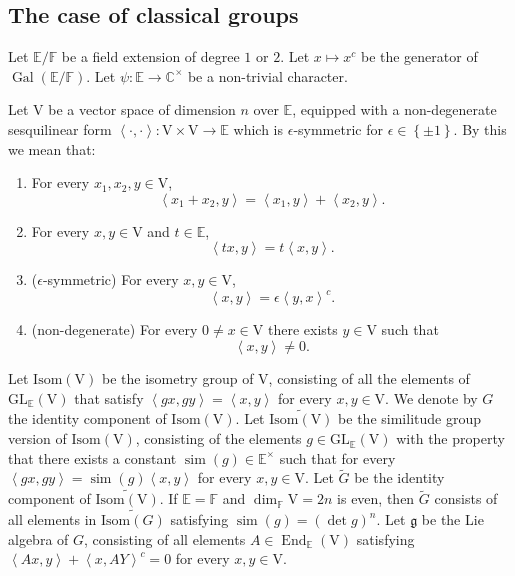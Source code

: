 \documentclass[12pt, reqno]{amsart}
\theoremstyle{definition}
\theoremstyle{definition}
\theoremstyle{definition}
\newcommand{\cComplex}{\mathbb{C}}
\newcommand{\multiplicativegroup}[1]{#1^{\times}}
\newcommand{\EndomorphismRing}{\operatorname{End}}
\newcommand{\hermitianSpace}{\mathrm{V}}
\newcommand{\similitudeCharacter}{\operatorname{sim}}
\newcommand{\innerproduct}[2]{\left\langle #1,#2\right\rangle}
\newcommand{\fieldCharacter}{\psi}
\newcommand{\involution}[1]{#1^{c}}
\newcommand{\GL}{\mathrm{GL}}
\newcommand{\GroupExtension}[1]{\widetilde{#1}}
\newcommand{\finiteField}{\mathbb{F}}
\newcommand{\quadraticExtension}{\mathbb{E}}
\newcommand{\Galois}{\operatorname{Gal}}
\newcommand{\IsometryGroup}{\mathrm{Isom}}
\newcommand{\lieAlgebra}{\mathfrak{g}}
\begin{document}
\subsection{The case of classical groups}

Let $\quadraticExtension \slash \finiteField$ be a field extension of degree $1$ or $2$. Let $x \mapsto \involution{x}$ be the generator of $\Galois\left(\quadraticExtension \slash \finiteField\right)$. Let $\fieldCharacter \colon \quadraticExtension \to \multiplicativegroup{\cComplex}$ be a non-trivial character.

Let $\hermitianSpace$ be a vector space of dimension $n$ over $\quadraticExtension$, equipped with a non-degenerate sesquilinear form $\innerproduct{\cdot}{\cdot} \colon \hermitianSpace \times \hermitianSpace \to \quadraticExtension$ which is $\epsilon$-symmetric for $\epsilon \in \left\{\pm 1\right\}$. By this we mean that:
\begin{enumerate}
	\item For every $x_1,x_2,y \in \hermitianSpace$, $$\innerproduct{x_1 + x_2}{y} = \innerproduct{x_1}{y} + \innerproduct{x_2}{y}.$$
	\item For every $x,y \in \hermitianSpace$ and $t \in \quadraticExtension$, $$\innerproduct{tx}{y} = t\innerproduct{x}{y}.$$
	\item ($\epsilon$-symmetric) For every $x,y \in \hermitianSpace$, $$\innerproduct{x}{y} = \epsilon \involution{\innerproduct{y}{x}}.$$
	\item (non-degenerate) For every $0 \ne x \in \hermitianSpace$ there exists $y \in \hermitianSpace$ such that $$\innerproduct{x}{y} \ne 0.$$
\end{enumerate}
Let $\IsometryGroup \left(\hermitianSpace\right)$ be the isometry group of $\hermitianSpace$, consisting of all the elements of $\GL_{\quadraticExtension}\left(\hermitianSpace\right)$ that satisfy $\innerproduct{gx}{gy} = \innerproduct{x}{y}$ for every $x,y \in \hermitianSpace$. We denote by $G$ the identity component of $\IsometryGroup\left(\hermitianSpace\right)$. Let $\GroupExtension{\IsometryGroup\left(\hermitianSpace\right)}$ be the similitude group version of $\IsometryGroup\left(\hermitianSpace\right)$, consisting of the elements $g \in \GL_{\quadraticExtension}\left(\hermitianSpace\right)$ with the property that there exists a constant $\similitudeCharacter\left(g\right) \in \multiplicativegroup{\quadraticExtension}$ such that for every $\innerproduct{gx}{gy} = \similitudeCharacter\left(g\right) \innerproduct{x}{y}$ for every $x,y \in \hermitianSpace$. Let $\GroupExtension{G}$ be the identity component of $\GroupExtension{\IsometryGroup\left(\hermitianSpace\right)}$. If $\quadraticExtension = \finiteField$ and $\dim_{\finiteField} \hermitianSpace = 2n$ is even, then $\GroupExtension{G}$ consists of all elements in $\GroupExtension{\IsometryGroup\left(G\right)}$ satisfying $\similitudeCharacter\left(g\right) = \left(\det g\right)^n$. Let $\lieAlgebra$ be the Lie algebra of $G$, consisting of all elements $A \in \EndomorphismRing_{\quadraticExtension}\left(\hermitianSpace\right)$ satisfying $\innerproduct{Ax}{y} + \involution{\innerproduct{x}{AY}} = 0$ for every $x, y \in \hermitianSpace$.
\end{document}
